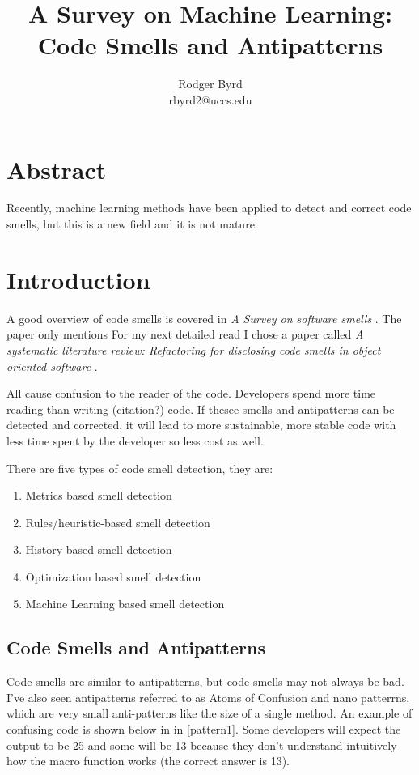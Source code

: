 \documentclass[conference]{IEEEtran}
\begin{document}

\title{A Survey on Machine Learning: Code Smells and Antipatterns}
\author{Rodger Byrd\\rbyrd2@uccs.edu}

\maketitle

\section{Abstract}
Recently, machine learning methods have been applied to detect and correct code smells, but this is a new field and it is not mature.

\section{Introduction}
A good overview of code smells is covered in \textit{A Survey on software smells} \cite{sharma_survey_2018}. 
The paper only mentions For my next detailed read I chose a paper called  \textit{A systematic literature review: Refactoring for disclosing code smells in object oriented software} \cite{singh_systematic_2018}. 

All cause confusion to the reader of the code. Developers spend more time reading than writing (citation?) code. If thesee smells and antipatterns can be detected and corrected, it will lead to more sustainable, more stable code with less time spent by the developer so less cost as well.

There are five types of code smell detection\cite{lafi_code_2019}, they are:
\begin{enumerate}
\item Metrics based smell detection
\item Rules/heuristic-based smell detection
\item History based smell detection
\item Optimization based smell detection
\item Machine Learning based smell detection
\end{enumerate}

\subsection{Code Smells and Antipatterns}
Code smells are similar to antipatterns, but code smells may not always be bad.
I've also seen antipatterns referred to as Atoms of Confusion \cite{gopstein_understanding_2017} and nano patterrns, which are very small anti-patterns like the size of a single method. 
An example of confusing code is shown below in in \ref{pattern1}.
Some developers will expect the output to be 25 and some will be 13 because they don't understand intuitively how the macro function works (the correct answer is 13).
\end{document}

